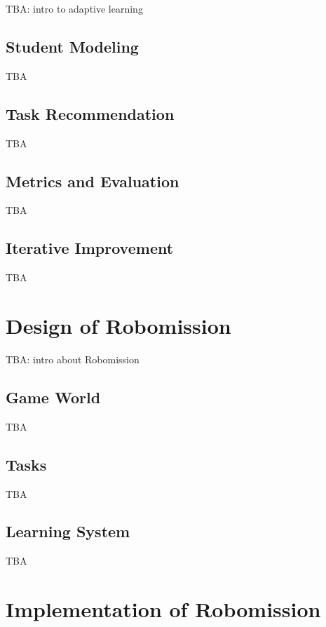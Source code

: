 \documentclass[
    digital,
    color,
    11pt,
    nocover,
    table,  %
    nolof,  %
    nolot,  %
    microtype,
]{fithesis3}
\begin{document}
TBA: intro to adaptive learning


\section{Student Modeling}
\label{sec:student-modeling}

TBA


\section{Task Recommendation}
\label{sec:task-recommendation}

TBA


\section{Metrics and Evaluation}
\label{sec:metrics-and-evaluation}

TBA


\section{Iterative Improvement}
\label{sec:iterative-improvement}

TBA


\chapter{Design of Robomission}
\label{chap:design-of-robomission}

TBA: intro about Robomission

\section{Game World}
\label{sec:robomission.game-world}

TBA

\section{Tasks}
\label{sec:robomission.tasks}

TBA


\section{Learning System}
\label{sec:robomission.system}

TBA


\chapter{Implementation of Robomission}
\label{chap:implementation-of-robomission}
\end{document}

